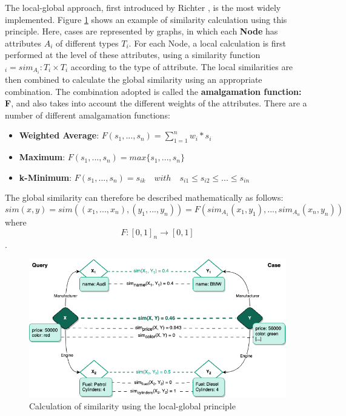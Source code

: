     The local-global approach, first introduced by Richter \cite{richter2008similarity, richter2013basic}, is the most widely implemented. Figure \ref{fig:cbr-exam} shows an example of similarity calculation using this principle. Here, cases are represented by graphs, in which each \textbf{Node} has attributes $A_i$ of different types $T_i$. For each Node, a local calculation is first performed at the level of these attributes, using a similarity function $_i = sim_{A_i} : T_i \times T_i$ according to the type of attribute. The local similarities are then combined to calculate the global similarity using an appropriate combination. The combination adopted is called the \textbf{amalgamation function: F}, and also takes into account the different weights of the attributes. There are a number of different amalgamation functions:
    \begin{itemize}
        \item \textbf{Weighted Average}: $F(s_1,...,s_n)= \sum_{1=1}^{n} w_i*s_i$
        \item \textbf{Maximum}: $F(s_1,...,s_n) = max\{s_1,...,s_n\}$
        \item \textbf{k-Minimum}: $F(s_1,...,s_n) = s_{ik} \quad with \quad s_{i1} \leq s_{i2} \leq ... \leq s_{in}$
    \end{itemize}
    
    The global similarity can therefore be described mathematically as follows:\\
    \[sim(x,y) = sim((x_1,...,x_n),(y_1,...,y_n)) = F(sim_{A_1}(x_1, y_1),..., sim_{A_n}(x_n, y_n) )\] where \[F: [0,1]_n \rightarrow [0,1]\].\\


    \begin{figure}[h]
    \centering
    \includegraphics[scale=0.6]{images/Concept-CBR Exemple.drawio.png}
    \caption{\label{fig:cbr-exam}  Calculation of similarity using the local-global principle}
    \end{figure}
    

